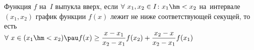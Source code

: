 
    Функция $f$ на~$I$ выпукла вверх, если $\forall\  x_1,x_2\in I\colon x_1\hm<x_2$ на~интервале $(x_1,x_2)$ график функции $f(x)$ лежит не ниже
    соответствующей секущей, то есть \\$\forall\  x\in (x_1\hm<x_2)\pau f(x)\geq\dfrac{x-x_1}{x_2-x_1}f(x_2)+\dfrac{x_2-x}{x_2-x_1}f(x_1)$
